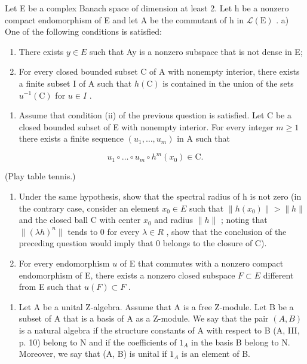 Let E be a complex Banach space of dimension at least 2. Let h be a nonzero compact endomorphism of E and let A be the commutant of h in \(\mathcal{L}(\mathrm{E})\) . a) One of the following conditions is satisfied:

\begin{enumerate}
\def\labelenumi{(\roman{enumi})}
\item
  There exists \(y \in E\) such that Ay is a nonzero subspace that is not dense in E;
\item
  For every closed bounded subset C of A with nonempty interior, there exists a finite subset I of A such that \(h(\mathrm{C})\) is contained in the union of the sets \(u^{-1}(\mathrm{C})\) for \(u \in I\) .
\end{enumerate}

\begin{enumerate}
\def\labelenumi{\alph{enumi})}
\setcounter{enumi}{1}
\tightlist
\item
  Assume that condition (ii) of the previous question is satisfied. Let C be a closed bounded subset of E with nonempty interior. For every integer \(m \geqslant 1\) there exists a finite sequence \((u_{1}, \ldots, u_{m})\) in A such that
\end{enumerate}

\[
u _ {1} \circ \dots \circ u _ {m} \circ h ^ {m} (x _ {0}) \in \mathrm{C}.
\]

(Play table tennis.)

\begin{enumerate}
\def\labelenumi{\alph{enumi})}
\setcounter{enumi}{2}
\item
  Under the same hypothesis, show that the spectral radius of h is not zero (in the contrary case, consider an element \(x_{0} \in E\) such that \(\|h(x_{0})\| > \|h\|\) and the closed ball C with center \(x_{0}\) and radius \(\|h\|\) ; noting that \(\|( \lambda h)^{n}\|\) tends to 0 for every \(\lambda \in R\) , show that the conclusion of the preceding question would imply that 0 belongs to the closure of C).
\item
  For every endomorphism \(u\) of E that commutes with a nonzero compact endomorphism of E, there exists a nonzero closed subspace \(F \subset E\) different from E such that \(u(F) \subset F\) .
\end{enumerate}

\begin{enumerate}
\def\labelenumi{\arabic{enumi})}
\setcounter{enumi}{5}
\tightlist
\item
  Let A be a unital Z-algebra. Assume that A is a free Z-module. Let B be a subset of A that is a basis of A as a Z-module. We say that the pair \((A, B)\) is a natural algebra if the structure constants of A with respect to B (A, III, p. 10) belong to N and if the coefficients of \(1_{A}\) in the basis B belong to N. Moreover, we say that (A, B) is unital if \(1_{A}\) is an element of B.
\end{enumerate}

